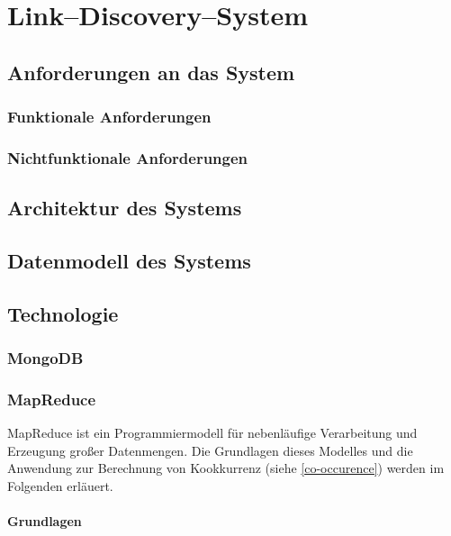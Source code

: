 \chapter{Link--Discovery--System}
\label{system}

\section{Anforderungen an das System}

\subsection{Funktionale Anforderungen}

\subsection{Nichtfunktionale Anforderungen}

\section{Architektur des Systems}

\section{Datenmodell des Systems}

\section{Technologie}

\subsection{MongoDB}

\subsection{MapReduce}
\label{mapreduce}

MapReduce \cite{dg2004} ist ein Programmiermodell für nebenläufige Verarbeitung und Erzeugung großer Datenmengen. Die Grundlagen dieses Modelles und die Anwendung zur Berechnung von Kookkurrenz (siehe \cref{co-occurence}) werden im Folgenden erläuert.

\subsubsection{Grundlagen}
\label{mapreduce_basic}

